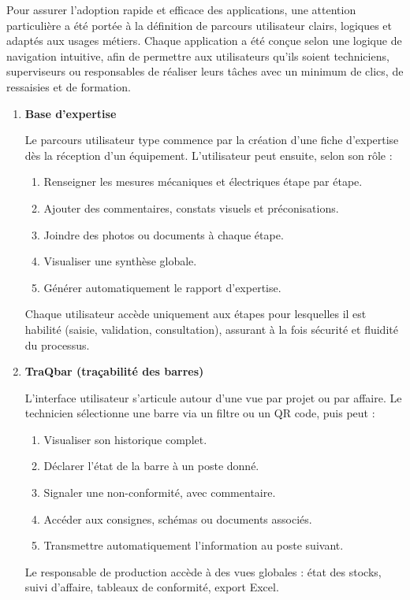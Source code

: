 \documentclass[11pt,a4paper]{article}
\begin{document}
Pour assurer l’adoption rapide et efficace des applications, une attention particulière a été portée à la définition de parcours utilisateur clairs, logiques et adaptés aux usages métiers. Chaque application a été conçue selon une logique de navigation intuitive, afin de permettre aux utilisateurs qu’ils soient techniciens, superviseurs ou responsables de réaliser leurs tâches avec un minimum de clics, de ressaisies et de formation.
\begin{enumerate}

\item \textbf{Base d’expertise} 

Le parcours utilisateur type commence par la création d’une fiche d’expertise dès la réception d’un équipement. L’utilisateur peut ensuite, selon son rôle :
\begin{enumerate}
    \item Renseigner les mesures mécaniques et électriques étape par étape.
    \item Ajouter des commentaires, constats visuels et préconisations.
    \item Joindre des photos ou documents à chaque étape.
    \item Visualiser une synthèse globale.
    \item Générer automatiquement le rapport d’expertise.
\end{enumerate}
Chaque utilisateur accède uniquement aux étapes pour lesquelles il est habilité (saisie, validation, consultation), assurant à la fois sécurité et fluidité du processus.

\item \textbf{TraQbar (traçabilité des barres)}

L’interface utilisateur s’articule autour d’une vue par projet ou par affaire. Le technicien sélectionne une barre via un filtre ou un QR code, puis peut :
\begin{enumerate}
    \item Visualiser son historique complet.
    \item Déclarer l’état de la barre à un poste donné.
    \item Signaler une non-conformité, avec  commentaire.
    \item Accéder aux consignes, schémas ou documents associés.
    \item Transmettre automatiquement l’information au poste suivant.
\end{enumerate}
Le responsable de production accède à des vues globales : état des stocks, suivi d’affaire, tableaux de conformité, export Excel.


\end{enumerate}
\end{document}
